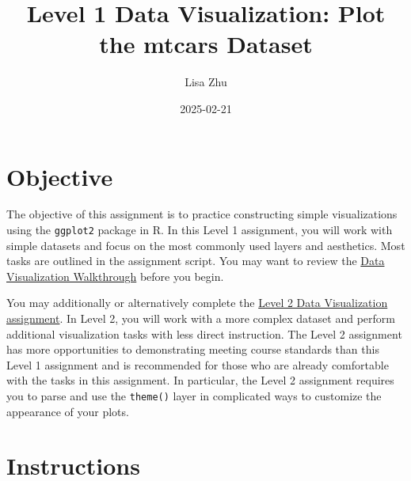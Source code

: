 \documentclass[
  man,
  floatsintext,
  longtable,
  nolmodern,
  notxfonts,
  notimes,
  colorlinks=true,linkcolor=blue,citecolor=blue,urlcolor=blue]{apa7}
\title{Level 1 Data Visualization: Plot the mtcars Dataset}
\author{Lisa Zhu}
\affiliation{
{MA Program in the Social Sciences, University of Chicago}}
\date{2025-02-21}
\begin{document}
\maketitle


\setcounter{secnumdepth}{-\maxdimen} %

\setlength\LTleft{0pt}


\section{Objective}\label{objective}

The objective of this assignment is to practice constructing simple
visualizations using the \texttt{ggplot2} package in R. In this Level 1
assignment, you will work with simple datasets and focus on the most
commonly used layers and aesthetics. Most tasks are outlined in the
assignment script. You may want to review the
\href{../00_viz-walkthrough}{Data Visualization Walkthrough} before you
begin.

You may additionally or alternatively complete the
\href{../02_viz-level-2}{Level 2 Data Visualization assignment}. In
Level 2, you will work with a more complex dataset and perform
additional visualization tasks with less direct instruction. The Level 2
assignment has more opportunities to demonstrating meeting course
standards than this Level 1 assignment and is recommended for those who
are already comfortable with the tasks in this assignment. In
particular, the Level 2 assignment requires you to parse and use the
\texttt{theme()} layer in complicated ways to customize the appearance
of your plots.

\section{Instructions}\label{instructions}
\end{document}
